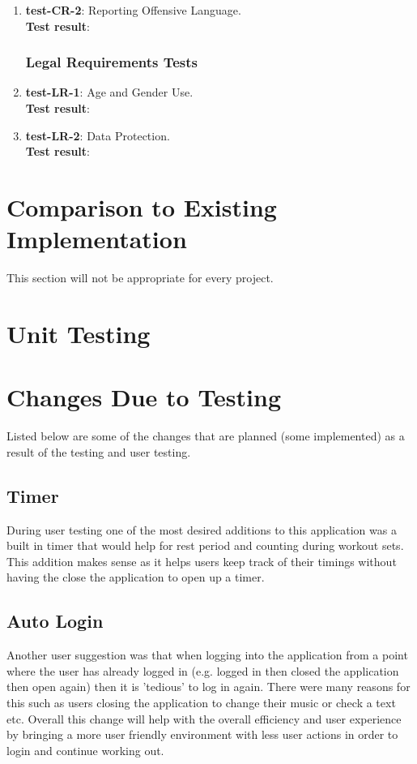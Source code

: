\documentclass[12pt, titlepage]{article}
\begin{document}
\begin{enumerate}
	\item{\textbf{test-CR-2}}: Reporting Offensive Language.\\
	\textbf{Test result}:
	
\subsubsection{Legal Requirements Tests}
	\item{\textbf{test-LR-1}}: Age and Gender Use.\\
	\textbf{Test result}:
	
	\item{\textbf{test-LR-2}}: Data Protection.\\
	\textbf{Test result}:
	
\end{enumerate}
	
\section{Comparison to Existing Implementation}	

This section will not be appropriate for every project.

\section{Unit Testing}

\section{Changes Due to Testing}
Listed below are some of the changes that are planned (some implemented) as a result of the testing and user testing.
\subsection{Timer}
During user testing one of the most desired additions to this application was a built in timer that would help for rest period and counting during workout sets. This addition makes sense as it helps users keep track of their timings without having the close the application to open up a timer. 
\subsection{Auto Login}
Another user suggestion was that when logging into the application from a point where the user has already logged in (e.g. logged in then closed the application then open again) then it is 'tedious' to log in again. There were many reasons for this such as users closing the application to change their music or check a text etc. Overall this change will help with the overall efficiency and user experience by bringing a more user friendly environment with less user actions in order to login and continue working out.
\end{document}
